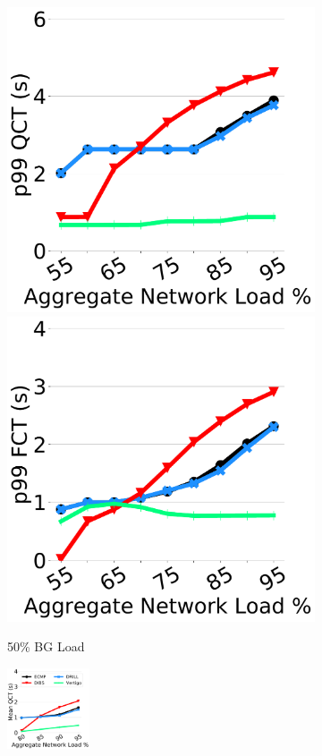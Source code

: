 \begin{figure}[th!]
\begin{subfigure}[t]{.32\linewidth}
	\includegraphics[width=0.85\linewidth]{figs/qps50_p99qct.pdf}
	\includegraphics[width=0.85\linewidth]{figs/qps50p99fct.pdf}
		\caption{\small{50\% BG Load}}
		\label{fig:qps50}
	\end{subfigure}
	\begin{subfigure}[t]{.32\linewidth}
	\centering
	\includegraphics[width=0.85\linewidth, height=2.4cm]{figs/qps75.pdf}

\end{subfigure}
\end{figure}
